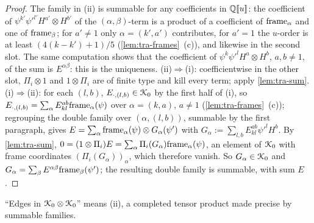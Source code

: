 \begin{proof}
The family in (ii) is summable for any coefficients in $\mathbb{Q}[\![ u ]\!]$: the coefficient of $\psi^{k'}\psi'^{l'}H^{a'}\otimes H^{b'}$ of the $(\alpha,\beta)$-term is a product of a coefficient of $\mathrm{frame}_\alpha$ and one of $\mathrm{frame}_\beta$; for $a'\neq 1$ only $\alpha = (k',a')$ contributes, for $a' = 1$ the $u$-order is at least $(4(k-k')+1)/5$ (\cref{lem:tra-frames}~(c)), and likewise in the second slot. The same computation shows that the coefficient of $\psi^k\psi'^lH^a\otimes H^b$, $a,b\neq 1$, of the sum is $E^{\alpha\beta}$: this is the uniqueness.
(ii)$\Rightarrow$(i): coefficientwise in the other slot, $\Pi_i\otimes 1$ and $1\otimes\Pi_i$ are of finite type and kill every term; apply \cref{lem:tra-sum}.
(i)$\Rightarrow$(ii): for each $(l,b)$, $E_{\cdot,(l,b)}\in\mathcal{K}_{0}$ by the first half of (i), so $E_{\cdot,(l,b)} = \sum_\alpha E^{ab}_{kl}\mathrm{frame}_\alpha(\psi)$ over $\alpha = (k,a)$, $a\neq 1$ (\cref{lem:tra-frames}~(c)); regrouping the double family over $(\alpha,(l,b))$, summable by the first paragraph, gives $E = \sum_\alpha\mathrm{frame}_\alpha(\psi)\otimes G_\alpha(\psi')$ with $G_\alpha := \sum_{l,b}E^{ab}_{kl}\psi'^lH^b$. By \cref{lem:tra-sum}, $0 = (1\otimes\Pi_i)E = \sum_\alpha\Pi_i(G_\alpha)\mathrm{frame}_\alpha(\psi)$, an element of $\mathcal{K}_{0}$ with frame coordinates $(\Pi_i(G_\alpha))_\alpha$, which therefore vanish. So $G_\alpha\in\mathcal{K}_{0}$ and $G_\alpha = \sum_\beta E^{\alpha\beta}\mathrm{frame}_\beta(\psi')$; the resulting double family is summable, with sum $E$.
\end{proof}

``Edges in $\mathcal{K}_{0}\otimes\mathcal{K}_{0}$'' means (ii), a completed tensor product made precise by summable families.


